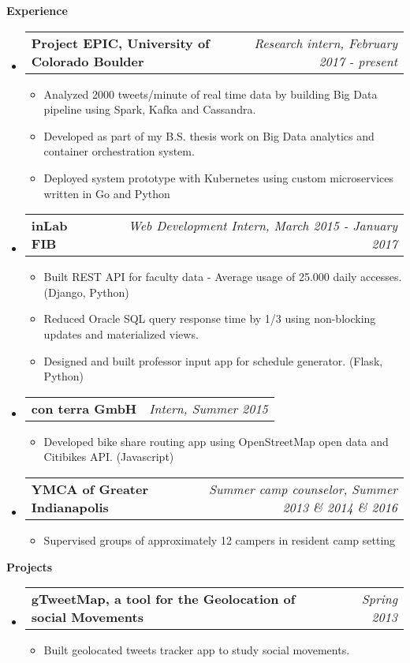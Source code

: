 \documentclass[letterpaper,10pt]{article}
\makeatletter
\newcommand{\resitem}[1]{\item #1 \vspace{-2pt}}
\newcommand{\resheading}[1]{{\large \colorbox{mygrey}{\begin{minipage}{\textwidth}{\textbf{#1 \vphantom{p\^{E}}}}\end{minipage}}}}
\newcommand{\ressubheading}[4]{
\begin{tabular*}{7.0in}{l@{\extracolsep{\fill}}r}
		\textbf{#1} & \textit{#4} \\
\end{tabular*}\vspace{-6pt}}
\makeatother
\begin{document}
\resheading{Experience}
\begin{itemize}
	\item
	\ressubheading{Project EPIC, University of Colorado Boulder}{Boulder, CO}{Research intern}{Research intern, February 2017 - present}
	\begin{itemize}
		\item Analyzed 2000 tweets/minute of real time data by building Big Data pipeline using Spark, Kafka and Cassandra. 
		\item Developed as part of my B.S. thesis work on Big Data analytics and container orchestration system.
		\item Deployed system prototype with Kubernetes using custom microservices written in Go and Python
	\end{itemize}
\item
	\ressubheading{inLab FIB}{Barcelona, Spain}{Web Development Intern}{Web Development Intern, March 2015 - January 2017}
	\begin{itemize}
		\resitem{Built REST API for faculty data - Average usage of 25.000 daily accesses. (Django, Python)}
  		\resitem{Reduced Oracle SQL query response time by 1/3 using non-blocking updates and materialized views.}
  		\resitem{Designed and built professor input app for schedule generator. (Flask, Python) }
	\end{itemize}

\item
	\ressubheading{con terra GmbH}{Münster, Germany}{Intern}{Intern, Summer 2015}
	\begin{itemize}
		\resitem{Developed bike share routing app using OpenStreetMap open data and Citibikes API. (Javascript)}
	\end{itemize}
\item
	\ressubheading{YMCA of Greater Indianapolis}{St. Paul, IN}{Summer camp counselor}{Summer camp counselor, Summer 2013 \& 2014 \& 2016}
		\begin{itemize}
		\resitem{Supervised groups of approximately 12 campers in resident camp setting}
	\end{itemize}
\end{itemize}

\resheading{Projects}
\begin{itemize}
\item
	\ressubheading{gTweetMap, a tool for the Geolocation of social Movements}{Barcelona, Spain}{Student}{Spring 2013}
	\begin{itemize}
		\resitem{Built geolocated tweets tracker app to study social movements.}
	\end{itemize}
\end{itemize}
\end{document}
